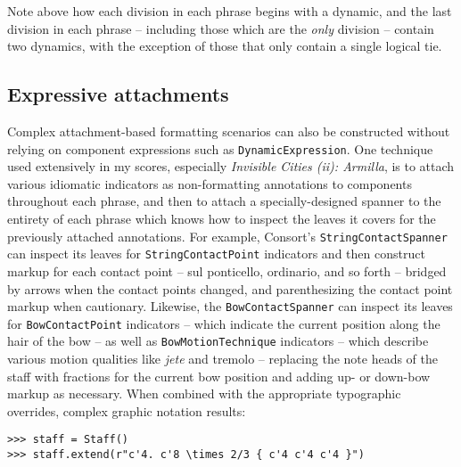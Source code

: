 \noindent Note above how each division in each phrase begins with a dynamic,
and the last division in each phrase -- including those which are the
\emph{only} division -- contain two dynamics, with the exception of those that
only contain a single logical tie.

\subsection{Expressive attachments}
\label{ssec:expressive-attachments}

\noindent Complex attachment-based formatting scenarios can also be constructed
without relying on component expressions such as \texttt{DynamicExpression}.
One technique used extensively in my scores, especially \emph{Invisible Cities
(ii): Armilla}, is to attach various idiomatic indicators as non-formatting
annotations to components throughout each phrase, and then to attach a
specially-designed spanner to the entirety of each phrase which knows how to
inspect the leaves it covers for the previously attached annotations. For
example, Consort's \texttt{StringContactSpanner} can inspect its leaves for
\texttt{StringContactPoint} indicators and then construct markup for each
contact point -- sul ponticello, ordinario, and so forth -- bridged by arrows
when the contact points changed, and parenthesizing the contact point markup
when cautionary. Likewise, the \texttt{BowContactSpanner} can inspect its
leaves for \texttt{BowContactPoint} indicators -- which indicate the current
position along the hair of the bow -- as well as \texttt{BowMotionTechnique}
indicators -- which describe various motion qualities like \emph{jete} and
tremolo -- replacing the note heads of the staff with fractions for the current
bow position and adding up- or down-bow markup as necessary. When combined with
the appropriate typographic overrides, complex graphic notation results:

\begin{comment}
<abjad>
staff = Staff()
staff.extend(r"c'4. c'8 \times 2/3 { c'4 c'4 c'4 }")
</abjad>
\end{comment}

\begin{abjadbookoutput}
\begin{singlespacing}
\vspace{-0.5\baselineskip}
\begin{verbatim}
>>> staff = Staff()
>>> staff.extend(r"c'4. c'8 \times 2/3 { c'4 c'4 c'4 }")
\end{verbatim}
\end{singlespacing}
\end{abjadbookoutput}

